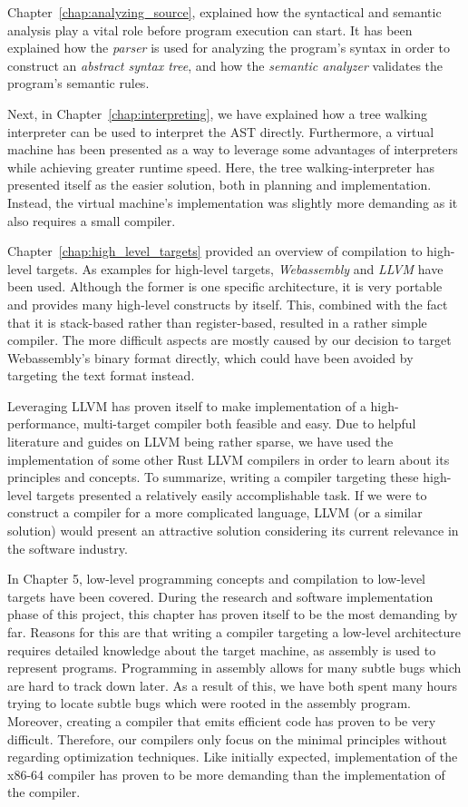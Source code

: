 Chapter~\ref{chap:analyzing_source}, explained how the syntactical and semantic analysis play a vital role before program execution can start.
It has been explained how the \emph{parser} is used for analyzing the program's syntax in order to construct an \emph{abstract syntax tree},
and how the \emph{semantic analyzer} validates the program's semantic rules.

Next, in Chapter~\ref{chap:interpreting}, we have explained how a tree walking interpreter can be used to interpret the AST directly.
Furthermore, a virtual machine has been presented as a way to leverage some advantages of interpreters while
achieving greater runtime speed.
Here, the tree walking-interpreter has presented itself as the easier solution, both in planning and implementation.
Instead, the virtual machine's implementation was slightly more demanding as it also requires a small compiler.

Chapter~\ref{chap:high_level_targets} provided an overview of compilation to high-level targets.
As examples for high-level targets, \emph{Webassembly} and \emph{LLVM} have been used.
Although the former is one specific architecture, it is very portable and provides many high-level constructs by itself.
This, combined with the fact that it is stack-based rather than register-based, resulted in a rather simple compiler.
The more difficult aspects are mostly caused by our decision to target Webassembly's binary format directly, which could have been avoided by targeting the text format instead.

Leveraging LLVM has proven itself to make implementation of a high-performance, multi-target compiler both feasible and easy.
Due to helpful literature and guides on LLVM being rather sparse, we have used the implementation of some other Rust LLVM compilers
in order to learn about its principles and concepts.
To summarize, writing a compiler targeting these high-level targets presented a relatively easily accomplishable task.
If we were to construct a compiler for a more complicated language, LLVM (or a similar solution) would present an attractive solution considering its current relevance in the software industry.

In Chapter 5, low-level programming concepts and compilation to low-level targets have been covered.
During the research and software implementation phase of this project,
this chapter has proven itself to be the most demanding by far.
Reasons for this are that writing a compiler targeting a low-level architecture
requires detailed knowledge about the target machine, as assembly is used to represent programs.
Programming in assembly allows for many subtle bugs which are hard to track down later.
As a result of this, we have both spent many hours trying to locate subtle bugs which were rooted in the assembly program.
Moreover, creating a compiler that emits efficient code has proven to be very difficult.
Therefore, our compilers only focus on the minimal principles without regarding optimization techniques.
Like initially expected, implementation of the x86-64 compiler has proven to be more demanding than the implementation of the \riscv{} compiler.

